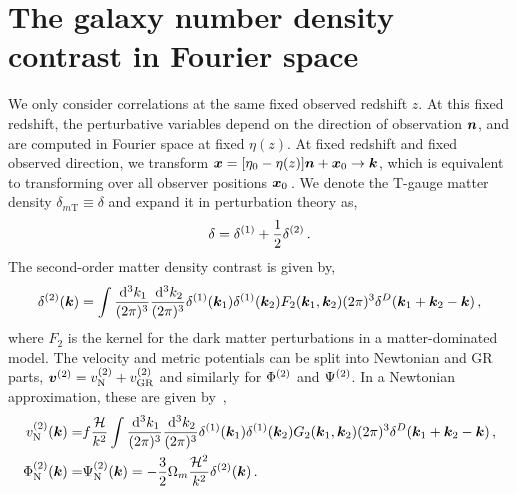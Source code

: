 \section{The galaxy number density contrast in Fourier space}
We only consider correlations at the same fixed observed redshift $z$. At this fixed redshift, the perturbative variables depend on the direction of observation $\bm {n}$, and are computed in Fourier space at fixed $\eta(z)$. At fixed redshift and fixed observed direction, we transform $\bm {x} = [\eta_0 - \eta(z)]\bm {n} + \bm {x}_0 \to \bm {k}$, which is equivalent to transforming over all observer positions $\bm {x}_0$\,. We denote the T-gauge matter density $\delta_{m\mathrm{T}} \equiv \delta$ and expand it in perturbation theory as, 
\begin{equation}
	\delta = \delta^{(1)} + \frac{1}{2} \delta^{(2)}\,.
\end{equation}
The second-order matter density contrast is given by,
\begin{equation}
	\delta^{(2)}(\bm {k}) = \int \frac{\,\mathrm{d}^3 k_1}{(2\pi)^3} \frac{\,\mathrm{d}^3 k_2}{(2\pi)^3} \delta^{(1)}(\bm {k}_1) \delta^{(1)}(\bm {k}_2) F_2(\bm {k}_1,\bm {k}_2)(2\pi)^3 \delta^D(\bm {k}_1+\bm {k}_2-\bm {k})\,,
\end{equation}
where $F_2$ is the kernel for the dark matter perturbations in a matter-dominated model.
The velocity and metric potentials can be split into Newtonian and GR parts, $\bm{v}^{(2)} = v_{\mathrm{N}}^{(2)} + v_{\mathrm{GR}}^{(2)}$ and similarly for $\Phi^{(2)}$ and $\Psi^{(2)}$. In a Newtonian approximation, these are given by~\cite{Bernardeau:2001qr}, 
\begin{align}
	v^{(2)}_{\mathrm{N}}(\bm {k}) =& f \frac{\mathcal{H}}{k^2} \int \frac{\,\mathrm{d}^3 k_1}{(2\pi)^3} \frac{\,\mathrm{d}^3 k_2}{(2\pi)^3} \delta^{(1)}(\bm {k}_1) \delta^{(1)}(\bm {k}_2) G_2(\bm {k}_1,\bm {k}_2) (2\pi)^3 \delta^D(\bm {k}_1+\bm {k}_2-\bm {k})\,,\\
	\Phi^{(2)}_{\mathrm{N}}(\bm {k}) =& \Psi^{(2)}_{\mathrm{N}}(\bm {k}) = - \frac{3}{2} \Omega_m \frac{\mathcal{H}^2}{k^2} \delta^{(2)}(\bm {k})\,.\label{eq:PsiSOnewtFT}
\end{align}

